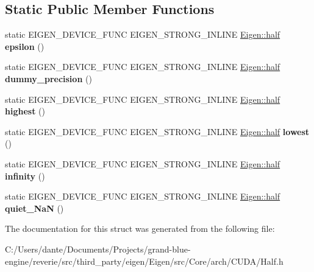 \subsection*{Static Public Member Functions}
\begin{DoxyCompactItemize}
\item 
\mbox{\label{struct_eigen_1_1_num_traits_3_01_eigen_1_1half_01_4_a6fffdc81a58bd3906030d469505ef63d}} 
static E\+I\+G\+E\+N\+\_\+\+D\+E\+V\+I\+C\+E\+\_\+\+F\+U\+NC E\+I\+G\+E\+N\+\_\+\+S\+T\+R\+O\+N\+G\+\_\+\+I\+N\+L\+I\+NE \mbox{\hyperlink{struct_eigen_1_1half}{Eigen\+::half}} {\bfseries epsilon} ()
\item 
\mbox{\label{struct_eigen_1_1_num_traits_3_01_eigen_1_1half_01_4_a09a018ebeae611c150313c8cda0f145a}} 
static E\+I\+G\+E\+N\+\_\+\+D\+E\+V\+I\+C\+E\+\_\+\+F\+U\+NC E\+I\+G\+E\+N\+\_\+\+S\+T\+R\+O\+N\+G\+\_\+\+I\+N\+L\+I\+NE \mbox{\hyperlink{struct_eigen_1_1half}{Eigen\+::half}} {\bfseries dummy\+\_\+precision} ()
\item 
\mbox{\label{struct_eigen_1_1_num_traits_3_01_eigen_1_1half_01_4_a67bf27437a43b8675e40045309539f98}} 
static E\+I\+G\+E\+N\+\_\+\+D\+E\+V\+I\+C\+E\+\_\+\+F\+U\+NC E\+I\+G\+E\+N\+\_\+\+S\+T\+R\+O\+N\+G\+\_\+\+I\+N\+L\+I\+NE \mbox{\hyperlink{struct_eigen_1_1half}{Eigen\+::half}} {\bfseries highest} ()
\item 
\mbox{\label{struct_eigen_1_1_num_traits_3_01_eigen_1_1half_01_4_a7d5f67182bb2516ea3efc7066295513b}} 
static E\+I\+G\+E\+N\+\_\+\+D\+E\+V\+I\+C\+E\+\_\+\+F\+U\+NC E\+I\+G\+E\+N\+\_\+\+S\+T\+R\+O\+N\+G\+\_\+\+I\+N\+L\+I\+NE \mbox{\hyperlink{struct_eigen_1_1half}{Eigen\+::half}} {\bfseries lowest} ()
\item 
\mbox{\label{struct_eigen_1_1_num_traits_3_01_eigen_1_1half_01_4_ac4e7248fc3f54219a3c5b07cedf4d518}} 
static E\+I\+G\+E\+N\+\_\+\+D\+E\+V\+I\+C\+E\+\_\+\+F\+U\+NC E\+I\+G\+E\+N\+\_\+\+S\+T\+R\+O\+N\+G\+\_\+\+I\+N\+L\+I\+NE \mbox{\hyperlink{struct_eigen_1_1half}{Eigen\+::half}} {\bfseries infinity} ()
\item 
\mbox{\label{struct_eigen_1_1_num_traits_3_01_eigen_1_1half_01_4_a0b8075845399063d92caa9e746eaf2e9}} 
static E\+I\+G\+E\+N\+\_\+\+D\+E\+V\+I\+C\+E\+\_\+\+F\+U\+NC E\+I\+G\+E\+N\+\_\+\+S\+T\+R\+O\+N\+G\+\_\+\+I\+N\+L\+I\+NE \mbox{\hyperlink{struct_eigen_1_1half}{Eigen\+::half}} {\bfseries quiet\+\_\+\+NaN} ()
\end{DoxyCompactItemize}


The documentation for this struct was generated from the following file\+:\begin{DoxyCompactItemize}
\item 
C\+:/\+Users/dante/\+Documents/\+Projects/grand-\/blue-\/engine/reverie/src/third\+\_\+party/eigen/\+Eigen/src/\+Core/arch/\+C\+U\+D\+A/Half.\+h\end{DoxyCompactItemize}
